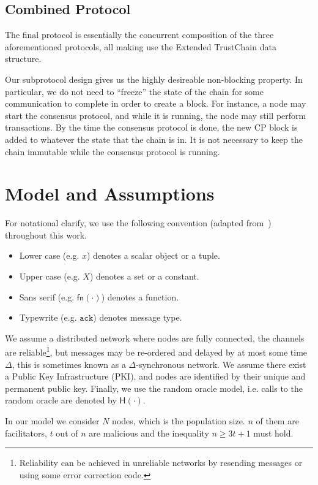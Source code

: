 \subsection{Combined Protocol}
\label{sec:combined-protocol}
The final protocol is essentially the concurrent composition of the three aforementioned protocols,
all making use the Extended TrustChain data structure.

Our subprotocol design gives us the highly desireable non-blocking property.
In particular, we do not need to ``freeze'' the state of the chain for some communication to complete in order to create a block.
For instance, a node may start the consensus protocol, and while it is running, the node may still perform transactions.
By the time the consensus protocol is done, the new CP block is added to whatever the state that the chain is in.
It is not necessary to keep the chain immutable while the consensus protocol is running.

\section{Model and Assumptions}
\label{sec:model-assumptions}

For notational clarify, we use the following convention (adapted from~\cite{miller2016honey}) throughout this work.
\begin{itemize}
\item Lower case (e.g. $x$) denotes a scalar object or a tuple.
\item Upper case (e.g. $X$) denotes a set or a constant.
\item Sans serif (e.g. $\textsf{fn}(\cdot)$) denotes a function.
\item Typewrite (e.g. $\texttt{ack}$) denotes message type.
\end{itemize}

We assume a distributed network where nodes are fully connected,
the channels are reliable\footnote{
    Reliability can be achieved in unreliable networks by resending messages or using some error correction code.
},
but messages may be re-ordered and delayed by at most some time $\Delta$,
this is sometimes known as a $\Delta$-synchronous network.
We assume there exist a Public Key Infrastructure (PKI), and nodes are identified by their unique and permanent public key.
Finally, we use the random oracle model, i.e. calls to the random oracle are denoted by $\textsf{H}(\cdot)$.

In our model we consider $N$ nodes, which is the population size.
$n$ of them are facilitators, $t$ out of $n$ are malicious and the inequality
$n \ge 3t + 1$ must hold.

